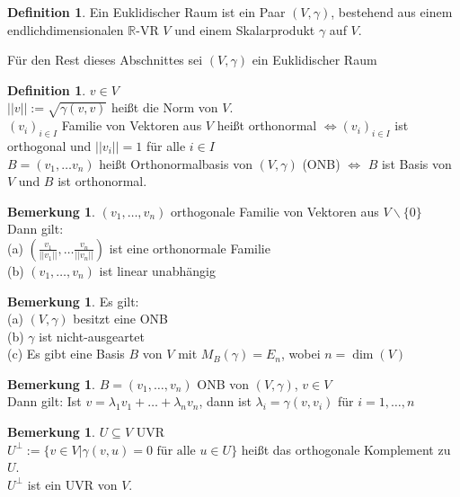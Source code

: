 \documentclass[10pt,a4paper,numbers=endperiod]{scrartcl}
\theoremstyle{definition}
\newtheorem{defi}[satz]{Definition}
\newtheorem{bem}[satz]{Bemerkung}
\def\RR{{\mathbb R}}
\begin{document}
\begin{defi}
	Ein Euklidischer Raum ist ein Paar $(V, \gamma)$, bestehend aus einem endlichdimensionalen $\RR$-VR $V$ und einem Skalarprodukt $\gamma$ auf $V$.
\end{defi}

Für den Rest dieses Abschnittes sei $(V, \gamma)$ ein Euklidischer Raum

\begin{defi}
	$v \in V$\\
	$|| v || := \sqrt{\gamma (v,v)}$ heißt die Norm von $V$.\\
	$(v_i)_{i \in I}$ Familie von Vektoren aus $V$ heißt orthonormal $\Leftrightarrow (v_i)_{i \in I}$ ist orthogonal und $||v_i|| = 1$ für alle $i \in I$\\
	$B = (v_1, \ldots v_n)$ heißt Orthonormalbasis von $(V,\gamma)$ (ONB) $\Leftrightarrow $ $B$ ist Basis von $V$ und $B$ ist orthonormal.
\end{defi}

\begin{bem}
	$(v_1, \ldots, v_n)$ orthogonale Familie von Vektoren aus $V \backslash \{0\}$\\
	Dann gilt:\\
	(a) $(\frac{v_1}{||v_1||}, \ldots \frac{v_n}{||v_n||})$ ist eine orthonormale Familie\\
	(b) $(v_1, \ldots, v_n)$ ist linear unabhängig
\end{bem}

\begin{bem}
	Es gilt:\\
	(a) $(V, \gamma)$ besitzt eine ONB\\
	(b) $\gamma$ ist nicht-ausgeartet\\
	(c) Es gibt eine Basis $B$ von $V$ mit $M_B (\gamma) = E_n$, wobei $n = \dim (V)$
\end{bem}

\begin{bem}
	$B = (v_1, \ldots, v_n)$ ONB von $(V,\gamma)$, $v \in V$\\
	Dann gilt: Ist $v = \lambda_1 v_1 + \ldots + \lambda_n v_n$, dann ist $\lambda_i = \gamma (v , v_i)$ für $i = 1, \ldots, n$ 
\end{bem}

\begin{bem}
	$U \subseteq V$ UVR\\
	$U^{\perp} := \{ v \in V | \gamma(v,u) = 0 \text{ für alle } u \in U\}$ heißt das orthogonale Komplement zu $U$.\\
	$U^\perp$ ist ein UVR von $V$. 
\end{bem}
\end{document}
